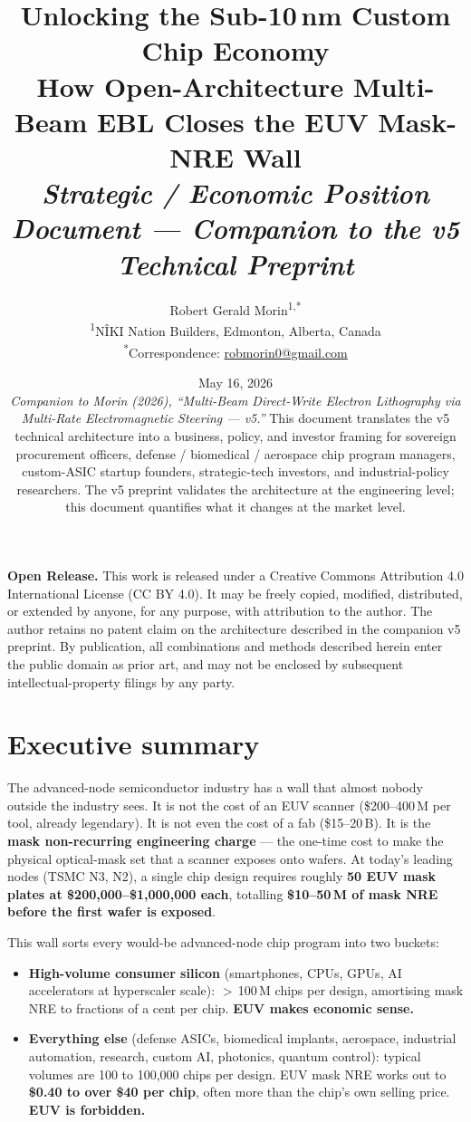 \documentclass[11pt,letterpaper]{article}
\title{\Large \textbf{Unlocking the Sub-10\,nm Custom Chip Economy}\\[0.3em]
  \large How Open-Architecture Multi-Beam EBL Closes the EUV Mask-NRE Wall\\[0.2em]
  \normalsize \textit{Strategic / Economic Position Document --- Companion to the v5 Technical Preprint}}
\author{Robert Gerald Morin\textsuperscript{1,*}\\[0.4em]
  {\small \textsuperscript{1}N\^{I}KI Nation Builders, Edmonton, Alberta, Canada}\\
  {\small \textsuperscript{*}Correspondence: \href{mailto:robmorin0@gmail.com}{robmorin0@gmail.com}}}
\date{May 16, 2026\\[0.3em]
  {\small \textit{Companion to Morin (2026), ``Multi-Beam Direct-Write Electron Lithography via Multi-Rate Electromagnetic Steering --- v5.''} This document translates the v5 technical architecture into a business, policy, and investor framing for sovereign procurement officers, defense / biomedical / aerospace chip program managers, custom-ASIC startup founders, strategic-tech investors, and industrial-policy researchers. The v5 preprint validates the architecture at the engineering level; this document quantifies what it changes at the market level.}}
\begin{document}
\maketitle
\thispagestyle{fancy}

\begin{mdframed}[linewidth=0.5pt,backgroundcolor=gray!4]
\textbf{Open Release.} This work is released under a Creative Commons Attribution 4.0 International License (CC BY 4.0). It may be freely copied, modified, distributed, or extended by anyone, for any purpose, with attribution to the author. The author retains no patent claim on the architecture described in the companion v5 preprint. By publication, all combinations and methods described herein enter the public domain as prior art, and may not be enclosed by subsequent intellectual-property filings by any party.
\end{mdframed}

\bigskip

\section{Executive summary}

The advanced-node semiconductor industry has a wall that almost nobody outside the industry sees. It is not the cost of an EUV scanner (\$200--400\,M per tool, already legendary). It is not even the cost of a fab (\$15--20\,B). It is the \textbf{mask non-recurring engineering charge} --- the one-time cost to make the physical optical-mask set that a scanner exposes onto wafers. At today's leading nodes (TSMC N3, N2), a single chip design requires roughly \textbf{50 EUV mask plates at \$200{,}000--\$1{,}000{,}000 each}, totalling \textbf{\$10--50\,M of mask NRE before the first wafer is exposed}.

This wall sorts every would-be advanced-node chip program into two buckets:

\begin{itemize}[leftmargin=1.6em]
  \item \textbf{High-volume consumer silicon} (smartphones, CPUs, GPUs, AI accelerators at hyperscaler scale): $>$\,100\,M chips per design, amortising mask NRE to fractions of a cent per chip. \textbf{EUV makes economic sense.}
  \item \textbf{Everything else} (defense ASICs, biomedical implants, aerospace, industrial automation, research, custom AI, photonics, quantum control): typical volumes are 100 to 100{,}000 chips per design. EUV mask NRE works out to \textbf{\$0.40 to over \$40 per chip}, often more than the chip's own selling price. \textbf{EUV is forbidden.}
\end{itemize}
\end{document}
